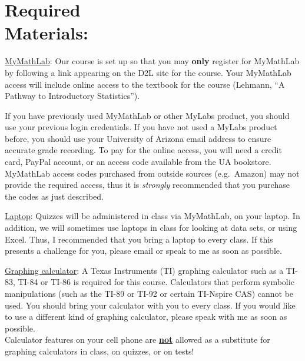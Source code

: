 \documentclass[11pt]{article}
\begin{document}
\vspace{0.5cm}


\section{\textbf{Required\\ Materials:}}
\vspace{-1.3cm}
\hangindent=5cm 
\underline{MyMathLab}: 
Our course is set up so that you may \textbf{only} register for MyMathLab by following a link appearing on the D2L site for the course.
Your MyMathLab access will include online access to the textbook for the course (Lehmann, ``A Pathway to Introductory Statistics'').

\hangindent=5cm 
If you have previously used MyMathLab or other MyLabs product, you should use your previous login credentials.
If you have not used a MyLabs product before, you should use your University of Arizona email address to ensure accurate grade recording.
To pay for the online access, you will need a credit card, PayPal account, or an access code available from the UA bookstore.
MyMathLab access codes purchased from outside sources (e.g.\ Amazon) may not provide the required access, thus it is \textit{strongly} recommended that you purchase the codes as just described.

\hangindent=5cm 
\underline{Laptop}: Quizzes will be administered in class via MyMathLab, on your laptop.
In addition, we will sometimes use laptops in class for looking at data sets, or using Excel.
Thus, I recommended that you bring a laptop to every class.
If this presents a challenge for you, please email or speak to me as soon as possible.

\hangindent=5cm 
\underline{Graphing calculator}: A Texas Instruments (TI) graphing calculator such as a TI-83, TI-84 or TI-86 is required for this course.  Calculators that perform symbolic manipulations (such as the TI-89 or TI-92 or certain TI-Nspire CAS) cannot be used.
You should bring your calculator with you to every class.
If you would like to use a different kind of graphing calculator, please speak with me as soon as possible.\\[2mm]
Calculator features on your cell phone are \textbf{\underline{not}} allowed as a substitute for graphing calculators in class, on quizzes, or on tests!\\
\end{document}

